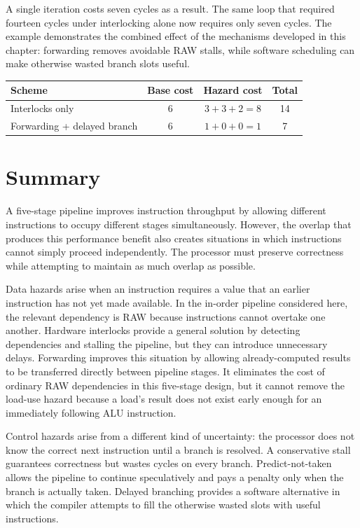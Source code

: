 \documentclass[12pt,a4paper]{report}
\begin{document}
A single iteration costs seven cycles as a result. The same loop that required fourteen cycles under interlocking alone now requires only seven cycles. The example demonstrates the combined effect of the mechanisms developed in this chapter: forwarding removes avoidable RAW stalls, while software scheduling can make otherwise wasted branch slots useful.

\begin{center}
\begin{tabular}{lccc}
\toprule
Scheme & Base cost & Hazard cost & Total \\
\midrule
Interlocks only & 6 & $3+3+2=8$ & 14 \\
Forwarding + delayed branch & 6 & $1+0+0=1$ & 7 \\
\bottomrule
\end{tabular}
\end{center}

\section{Summary}
\label{sec:ch2-summary}

A five-stage pipeline improves instruction throughput by allowing different instructions to occupy different stages simultaneously. However, the overlap that produces this performance benefit also creates situations in which instructions cannot simply proceed independently. The processor must preserve correctness while attempting to maintain as much overlap as possible.

Data hazards arise when an instruction requires a value that an earlier instruction has not yet made available. In the in-order pipeline considered here, the relevant dependency is RAW because instructions cannot overtake one another. Hardware interlocks provide a general solution by detecting dependencies and stalling the pipeline, but they can introduce unnecessary delays. Forwarding improves this situation by allowing already-computed results to be transferred directly between pipeline stages. It eliminates the cost of ordinary RAW dependencies in this five-stage design, but it cannot remove the load-use hazard because a load's result does not exist early enough for an immediately following ALU instruction.~\cite{sarangi}

Control hazards arise from a different kind of uncertainty: the processor does not know the correct next instruction until a branch is resolved. A conservative stall guarantees correctness but wastes cycles on every branch. Predict-not-taken allows the pipeline to continue speculatively and pays a penalty only when the branch is actually taken. Delayed branching provides a software alternative in which the compiler attempts to fill the otherwise wasted slots with useful instructions.~\cite{sarangi}
\end{document}
